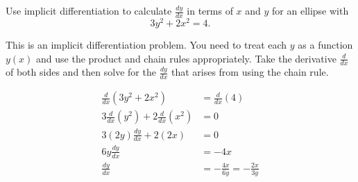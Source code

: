 \documentclass{ximera}
\author{Emma Smith Zbarsky}
\begin{document}
\begin{exercise}

Use implicit differentiation to calculate $\frac{dy}{dx}$ in terms of
$x$ and $y$ for an ellipse with \[3y^2+2x^2 = 4.\]


\begin{hint}
This is an implicit differentiation problem. You need to treat each $y$
as a function $y(x)$ and use the product and chain rules appropriately.
Take the derivative $\frac{d}{dx}$ of both sides and then solve for the
$\frac{dy}{dx}$ that arises from using the chain rule.
\end{hint}


\begin{hint}
\begin{align*}
\frac{d}{dx}\left(3y^2+2x^2\right) &= \frac{d}{dx}(4) \\
3\frac{d}{dx}\left(y^2\right) + 2\frac{d}{dx}\left(x^2\right) &= 0 \\
3\left(2y\right)\frac{dy}{dx} + 2\left(2x\right) &= 0 \\
6y\frac{dy}{dx} &= -4x \\
\frac{dy}{dx} &= -\frac{4x}{6y} = -\frac{2x}{3y}
\end{align*}
\end{hint}


\begin{multipleChoice}
\end{multipleChoice}

\end{exercise}
\end{document}
